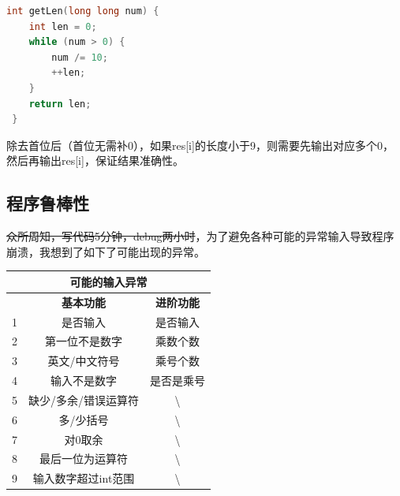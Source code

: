 \documentclass[a4paper, 11pt, UTF8]{ctexart}
\begin{document}
\begin{lstlisting}[language=C++, basicstyle=\ttfamily]
 int getLen(long long num) {
    int len = 0;
    while (num > 0) {
        num /= 10;
        ++len;
    }
    return len;
 }
\end{lstlisting}

除去首位后（首位无需补0），如果res[i]的长度小于9，则需要先输出对应多个0，然后再输出res[i]，保证结果准确性。

\subsection{程序鲁棒性}

\sout{众所周知，写代码5分钟，debug两小时}，为了避免各种可能的异常输入导致程序崩溃，我想到了如下了可能出现的异常。

\begin{table}[H]
    \centering
    \begin{tabular}{|ccc|}
        \hline
        \multicolumn{3}{|c|}{\textbf{可能的输入异常}}                                           \\ \hline
        \multicolumn{1}{|c|}{}  & \multicolumn{1}{c|}{\textbf{基本功能}}    & \textbf{进阶功能} \\ \hline
        \multicolumn{1}{|c|}{1} & \multicolumn{1}{c|}{是否输入}             & 是否输入          \\ \hline
        \multicolumn{1}{|c|}{2} & \multicolumn{1}{c|}{第一位不是数字}       & 乘数个数          \\ \hline
        \multicolumn{1}{|c|}{3} & \multicolumn{1}{c|}{英文/中文符号}        & 乘号个数          \\ \hline
        \multicolumn{1}{|c|}{4} & \multicolumn{1}{c|}{输入不是数字}         & 是否是乘号        \\ \hline
        \multicolumn{1}{|c|}{5} & \multicolumn{1}{c|}{缺少/多余/错误运算符} & \textbackslash{}  \\ \hline
        \multicolumn{1}{|c|}{6} & \multicolumn{1}{c|}{多/少括号}            & \textbackslash{}  \\ \hline
        \multicolumn{1}{|c|}{7} & \multicolumn{1}{c|}{对0取余}              & \textbackslash{}  \\ \hline
        \multicolumn{1}{|c|}{8} & \multicolumn{1}{c|}{最后一位为运算符}     & \textbackslash{}  \\ \hline
        \multicolumn{1}{|c|}{9} & \multicolumn{1}{c|}{输入数字超过int范围}  & \textbackslash{}  \\ \hline
    \end{tabular}
\end{table}
\end{document}
